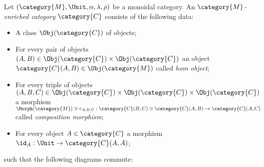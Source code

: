 \documentclass[DIN, pagenumber=false, fontsize=11pt, parskip=half, colorinlistoftodos, svgnames]{scrartcl}
\begin{document}
	\begin{definition}
		\label{def: enrichment}
		Let $(\category{M}, \Unit, \alpha, \lambda, \rho) $ be a monoidal category. An $\category{M} $\emph{-enriched category} $\category{C} $ consists of the following data:
		\begin{itemize}
			\item 
			A class $\Obj(\category{C}) $ of objects;
			\item 
			For every pair of objects $(A, B) \in \Obj(\category{C}) \times \Obj(\category{C}) $ an object 
			$\category{C}(A, B) \in \Obj(\category{M}) $
			called \emph{hom object};
			\item 
			For every triple of objects 
			$(A, B, C) \in \Obj(\category{C}) \times \Obj(\category{C}) \times \Obj(\category{C}) $
			a morphism 
			$\Morph(\category{M}) \ni \circ_{A, B, C}: \category{C}(B, C) \otimes \category{C}(A, B) \rightarrow \category{C}(A, C) $
			called \emph{composition morphism};
			\item 
			For every object $A \in \category{C} $ a morphism $ \id_A : \Unit \rightarrow \category{C}(A, A) $;
		\end{itemize}
		such that the following diagrams commute:
		\begin{center}
		\end{center}
		
		\begin{center}
		\end{center}
	\end{definition}
	
\end{document}
